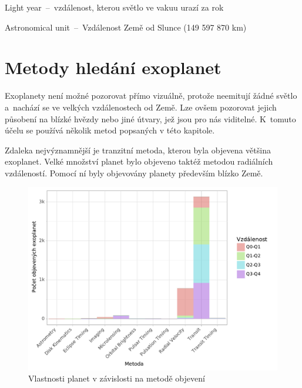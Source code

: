 \documentclass[a4paper,12pt]{article}
\renewcommand{\lstlistingname}{Zdrojový kód}
\let\oldlstlistoflistings\lstlistoflistings
\renewcommand{\lstlistoflistings}{%
  \begingroup%
  \let\oldnumberline\numberline%
  \renewcommand{\numberline}{\lstlistingname~\oldnumberline}%
  \oldlstlistoflistings%
  \endgroup}
\begin{document}

\desky
\titulniStrana
\generujZadani
\generujProhlaseni
\podekovaniDolu
\generujPodekovani
\generujAnotaci	
\generujAnnotation
\generujObsah
\generujSeznamObrazku
\lstlistoflistings
\seznamZkratek

\begin{description}[font=\mdseries,leftmargin=6em,labelwidth=!,]
\item[ly]		Light year~--~vzdálenost, kterou světlo ve vakuu urazí za rok
\item[AU]		Astronomical unit~--~Vzdálenost Země od Slunce (149 597 870 km)
\end{description}


\clearpage
\pagestyle{plain}

\section{Metody hledání exoplanet}

Exoplanety není možné pozorovat přímo vizuálně, protože neemitují žádné světlo a~nachází se ve velkých vzdálenostech od Země. Lze ovšem pozorovat jejich působení na blízké hvězdy nebo jiné útvary, jež jsou pro nás viditelné. K~tomuto účelu se používá několik metod popsaných v této kapitole.

Zdaleka nejvýznamnější je tranzitní metoda, kterou byla objevena většina exoplanet. Velké množství planet bylo objeveno taktéž metodou radiálních vzdáleností. Pomocí ní byly objevovány planety především blízko Země.

\begin{figure}[!htb]
\begin{center}
\includegraphics[width=\textwidth]{stats/count_by_method.pdf}
\caption[Vlastnosti planet v závislosti na metodě objevení]{Vlastnosti planet v závislosti na metodě objevení}
\end{center}
\end{figure}
\end{document}
